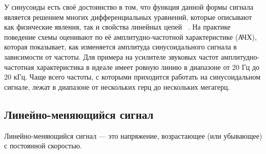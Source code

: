 	
	У синусоиды есть своё достоинство в том, что функция данной формы сигнала является решением многих дифференциальных уравнений, которые описывают как физические явления, так и свойства линейных цепей ~\cite{dgs}. На практике поведение схемы оценивают по её амплитудно-частотной характеристике (АЧХ), которая показывает, как изменяется амплитуда синусоидального сигнала в зависимости от частоты. Для примера на усилителе звуковых частот амплитудно-частотная характеристика в идеале имеет ровную линию в диапазоне от 20 Гц до 20 кГц. Чаще всего частоты, с которыми приходится работать на синусоидальном сигнале, лежат в диапазоне от нескольких герц до нескольких мегагерц.

\subsection{Линейно-меняющийся сигнал}
	Линейно-меняющийся сигнал --- это напряжение, возрастающее (или убывающее) с постоянной скоростью.

